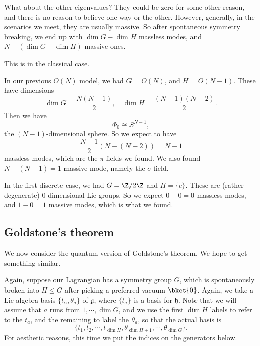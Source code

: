\documentclass[a4paper]{article}
\begin{document}
What about the other eigenvalues? They could be zero for some other reason, and there is no reason to believe one way or the other. However, generally, in the scenarios we meet, they are usually massive. So after spontaneous symmetry breaking, we end up with $\dim G - \dim H$ massless modes, and $N - (\dim G - \dim H)$ massive ones.

This is  in the classical case.
\begin{eg}
  In our previous $O(N)$ model, we had $G = O(N)$, and $H = O(N - 1)$. These have dimensions
  \[
    \dim G = \frac{N(N - 1)}{2},\quad \dim H = \frac{(N - 1)(N - 2)}{2}.
  \]
  Then we have
  \[
    \Phi_0 \cong S^{N - 1},
  \]
  the $(N - 1)$-dimensional sphere. So we expect to have
  \[
    \frac{N - 1}{2} (N - (N - 2)) = N - 1
  \]
  massless modes, which are the $\pi$ fields we found. We also found $N - (N - 1) = 1$ massive mode, namely the $\sigma$ field.
\end{eg}

\begin{eg}
  In the first discrete case, we had $G = \Z/2\Z$ and $H = \{e\}$. These are (rather degenerate) $0$-dimensional Lie groups. So we expect $0 - 0 = 0$ massless modes, and $1 - 0 = 1$ massive modes, which is what we found.
\end{eg}
\subsection{Goldstone's theorem}
We now consider the quantum version of Goldstone's theorem. We hope to get something similar.

Again, suppose our Lagrangian has a symmetry group $G$, which is spontaneously broken into $H \leq G$ after picking a preferred vacuum $\bket{0}$. Again, we take a Lie algebra basis $\{t_a, \theta_a\}$ of $\mathfrak{g}$, where $\{t_a\}$ is a basis for $\mathfrak{h}$. Note that we will assume that $a$ runs from $1, \cdots, \dim G$, and we use the first $\dim H$ labels to refer to the $t_a$, and the remaining to label the $\theta_a$, so that the actual basis is
\[
  \{t_1, t_2, \cdots, t_{\dim H}, \theta_{\dim H + 1}, \cdots, \theta_{\dim G}\}.
\]
For aesthetic reasons, this time we put the indices on the generators below.
\end{document}
